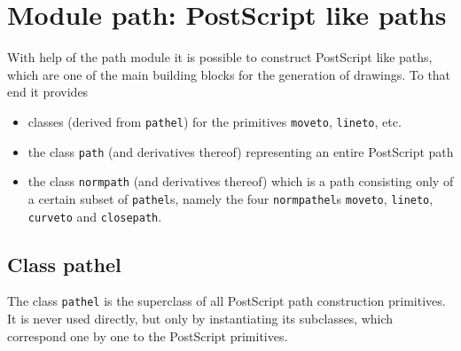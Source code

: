 \chapter{Module path: PostScript like paths}

\label{path}

With help of the path module it is possible to construct PostScript like 
paths, which are one of the main building blocks for the generation of 
drawings. To that end it provides 
\begin{itemize}
\item classes (derived from \verb|pathel|) for the primitives \verb|moveto|, \verb|lineto|, etc.
\item the class \verb|path| (and derivatives thereof) representing an
  entire PostScript path
\item the class \verb|normpath| (and derivatives thereof) which is a
  path consisting only of a certain subset of \verb|pathel|s, namely
  the four \verb|normpathel|s \verb|moveto|, \verb|lineto|,
  \verb|curveto| and \verb|closepath|.
\end{itemize}

\section{Class pathel}

The class \verb|pathel| is the superclass of all PostScript path
construction primitives. It is never used directly, but only by
instantiating its subclasses, which correspond one by one to the
PostScript primitives.

